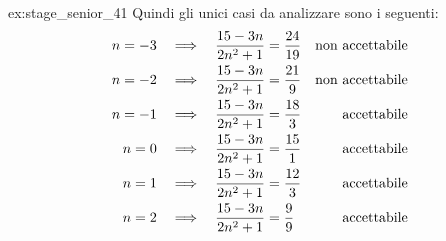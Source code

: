 \begin{soluzione}{ex:stage_senior_41}
    Quindi gli unici casi da analizzare sono i seguenti:
    \begin{align*}
        n = -3 & \quad\Longrightarrow\quad  \dfrac{15 - 3n}{2n^2 + 1} = \dfrac{24}{19} &\text{non accettabile} \\
        n = -2 & \quad\Longrightarrow\quad  \dfrac{15 - 3n}{2n^2 + 1} = \dfrac{21}{9} &\text{non accettabile} \\
        n = -1 & \quad\Longrightarrow\quad  \dfrac{15 - 3n}{2n^2 + 1} = \dfrac{18}{3} &\text{accettabile} \\
        n = 0 & \quad\Longrightarrow\quad  \dfrac{15 - 3n}{2n^2 + 1} = \dfrac{15}{1} &\text{accettabile} \\
        n = 1 & \quad\Longrightarrow\quad  \dfrac{15 - 3n}{2n^2 + 1} = \dfrac{12}{3} &\text{accettabile} \\
        n = 2 & \quad\Longrightarrow\quad  \dfrac{15 - 3n}{2n^2 + 1} = \dfrac{9}{9} &\text{accettabile}
    \end{align*}
\end{soluzione}

